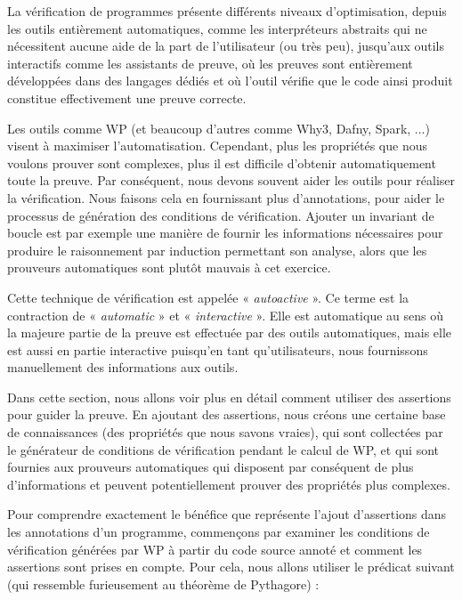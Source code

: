 La vérification de programmes présente différents niveaux d'optimisation,
depuis les outils entièrement automatiques, comme les interpréteurs abstraits
qui ne nécessitent aucune aide de la part de l'utilisateur (ou très peu),
jusqu'aux outils interactifs comme les assistants de preuve, où les preuves sont
entièrement développées dans des langages dédiés et où l'outil vérifie que le
code ainsi produit constitue effectivement une preuve correcte.


Les outils comme WP (et beaucoup d'autres comme Why3, Dafny, Spark, ...) visent à
maximiser l'automatisation. Cependant, plus les propriétés que nous voulons
prouver sont complexes, plus il est difficile d'obtenir automatiquement toute
la preuve. Par conséquent, nous devons souvent aider les outils pour réaliser
la vérification. Nous faisons cela en fournissant plus d'annotations,
pour aider le processus de génération des conditions de vérification. Ajouter un
invariant de boucle est par exemple une manière de fournir les informations
nécessaires pour produire le raisonnement par induction permettant son analyse,
alors que les prouveurs automatiques sont plutôt mauvais à cet exercice.


Cette technique de vérification est appelée « \textit{autoactive} ». Ce terme est la
contraction de « \textit{automatic} » et « \textit{interactive} ». Elle est automatique
au sens où la majeure partie de la preuve est effectuée par des outils automatiques, mais
elle est aussi en partie interactive puisqu'en tant qu'utilisateurs, nous
fournissons manuellement des informations aux outils.


Dans cette section, nous allons voir plus en détail comment
utiliser des assertions pour guider la preuve. En ajoutant des assertions, nous
créons une certaine base de connaissances (des propriétés que nous savons vraies),
qui sont collectées par le générateur de conditions de vérification pendant le calcul
de WP, et qui sont fournies aux prouveurs automatiques qui disposent par conséquent
de plus d'informations et peuvent potentiellement prouver des propriétés plus complexes.




Pour comprendre exactement le bénéfice que représente l'ajout d'assertions dans
les annotations d'un programme, commençons par examiner les
conditions de vérification générées par WP à partir du code source annoté et comment
les assertions sont prises en compte. Pour cela, nous allons utiliser le prédicat
suivant (qui ressemble furieusement au théorème de Pythagore) :



